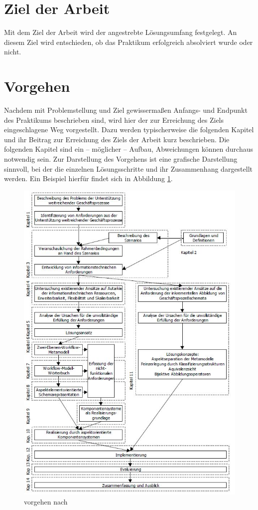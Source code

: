 \documentclass[oneside]{ausarbeitung}
\begin{document}
\section{Ziel der Arbeit}
\label{sec:ziel}

Mit dem Ziel der Arbeit wird der angestrebte Lösungsumfang festgelegt. An diesem Ziel wird entschieden, ob das Praktikum erfolgreich absolviert wurde oder nicht.

\section{Vorgehen}
\label{sec:vorgehen}

Nachdem mit Problemstellung und Ziel gewissermaßen Anfangs- und Endpunkt 
des Praktikums beschrieben sind, wird hier der zur Erreichung des Ziels 
eingeschlagene Weg vorgestellt. Dazu werden typischerweise die folgenden 
Kapitel und ihr Beitrag zur Erreichung des Ziels der Arbeit kurz 
beschrieben. Die folgenden Kapitel sind ein – möglicher – Aufbau, 
Abweichungen können durchaus notwendig sein. Zur Darstellung des 
Vorgehens ist eine grafische Darstellung sinnvoll, bei der die einzelnen 
Lösungsschritte und ihr Zusammenhang dargestellt werden. Ein Beispiel 
hierfür findet sich in Abbildung \ref{fig:1}.

\begin{figure}[htbp]
  \centering
  \includegraphics[height=0.9\textheight]{img/ausarbeitung.jpg}
  \caption{vorgehen nach \autocite{Schmidt:Geschaeftsprozesse}}
  \label{fig:1}
\end{figure}
\end{document}
